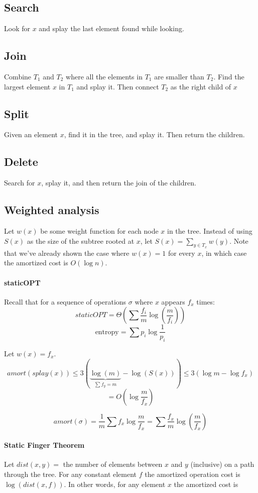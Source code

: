 \documentclass[a4paper]{article}
\begin{document}
\subsection{Search}
Look for $x$ and splay the last element found while looking.

\subsection{Join}
Combine $T_1$ and $T_2$ where all the elements in $T_1$ are smaller than $T_2$.
Find the largest element $x$ in $T_1$ and splay it. Then connect $T_2$ as the right child of $x$

\subsection{Split}
Given an element $x$, find it in the tree, and splay it. Then return the children.

\subsection{Delete}
Search for $x$, splay it, and then return the join of the children.

\subsection{Weighted analysis}
Let $w(x)$ be some weight function for each node $x$ in the tree.
Instead of using $S(x)$ as the size of the subtree rooted at $x$, let $S(x)=\sum_{y\in T_x} w(y)$.
Note that we've already shown the case where $w(x)=1$ for every $x$, in which case the amortized cost is $O(\log n)$.

\paragraph{staticOPT}
Recall that for a sequence of operations $\sigma$ where $x$ appears $f_x$ times:
\[staticOPT=\Theta\left( \sum \frac{f_i}{m} \log\left(\frac{m}{f_i}\right)\right)\]
\[\text{entropy}=\sum p_i \log \frac{1}{p_i}\]

Let $w(x)=f_x$.
\[amort(splay(x))\le 3(\underbrace{\log(m)}_{\sum f_y=m} - \log(S(x))) \le 3(\log m - \log f_x)\]
\[=O\left(\log \frac{m}{f_x}\right)\]

\[amort(\sigma)=\frac{1}{m}\sum f_x \log \frac{m}{f_x}=\sum \frac{f_x}{m} \log\left(\frac{m}{f_x}\right)\]

\paragraph{Static Finger Theorem}
Let $dist(x,y)=$ the number of elements between $x$ and $y$ (inclusive) on a path through the tree.
For any constant element $f$ the amortized operation cost is $\log(dist(x,f))$. In other words, for any element $x$ the amortized cost is 
\end{document}
